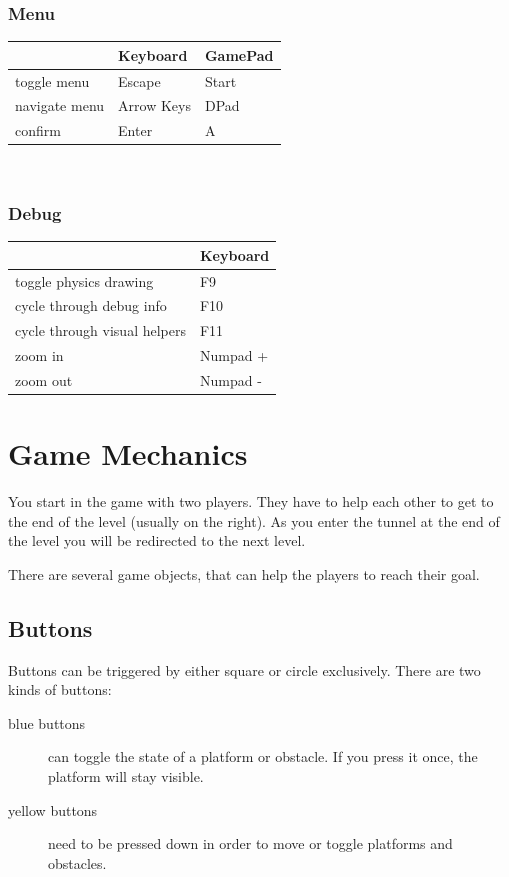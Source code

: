 \documentclass[12pt,a4paper]{scrartcl}
\begin{document}
\subsubsection*{Menu}
\begin{tabular}{l | p{3cm} | p{6cm} }
 & Keyboard & GamePad\\ \hline
toggle menu & Escape & Start\\
navigate menu & Arrow Keys & DPad\\
confirm & Enter & A
\end{tabular}
\\
\subsubsection*{Debug}
\begin{tabular}{l | p{3cm}}
 & Keyboard \\ \hline
toggle physics drawing & F9 \\
cycle through debug info & F10 \\
cycle through visual helpers & F11\\
zoom in & Numpad + \\
zoom out & Numpad -
\end{tabular}


\section*{Game Mechanics}
You start in the game with two players. They have to help each other to get to the end of the level (usually on the right). As you enter the tunnel at the end of the level you will be redirected to the next level.

There are several game objects, that can help the players to reach their goal.

\subsection*{Buttons}
Buttons can be triggered by either square or circle exclusively. There are two kinds of buttons:
\begin{description}
\item[blue buttons] can toggle the state of a platform or obstacle. If you press it once, the platform will stay visible. 
\item [yellow buttons] need to be pressed down in order to move or toggle platforms and obstacles.
\end{description}
\end{document}
